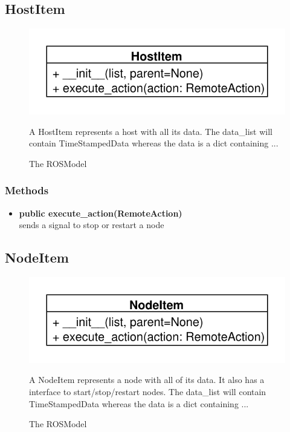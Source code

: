 \subsection{HostItem}
\begin{figure}[htbp]
	\begin{minipage}[t]{7cm}
		\vspace{0pt}
		\centering
		\includegraphics[scale=0.6]{./diagram_pictures/HostItem.pdf}
		\caption{The ROSModel}
	\end{minipage}
	\hfill
	\begin{minipage}[t]{8cm}
		\vspace{10pt}		
		A HostItem represents a host with all its data.
		The data\_list will contain TimeStampedData whereas the data is a dict
		containing ...
	\end{minipage}
\end{figure}
\subsubsection{Methods}
\begin{itemize}
  \item \textbf{public execute\_action(RemoteAction)}\\
  sends a signal to stop or restart a node
\end{itemize}

\subsection{NodeItem}
\begin{figure}[htbp]
	\begin{minipage}[t]{7cm}
		\vspace{0pt}
		\centering
		\includegraphics[scale=0.6]{./diagram_pictures/NodeItem.pdf}
		\caption{The ROSModel}
	\end{minipage}
	\hfill
	\begin{minipage}[t]{8cm}
		\vspace{10pt}		
		A NodeItem represents a node with all of its data. It also has a interface to
		start/stop/restart nodes. The data\_list will contain TimeStampedData whereas
		the data is a dict containing ...
	\end{minipage}
\end{figure} 
